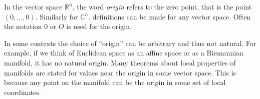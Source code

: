 \documentclass[12pt]{article}
\begin{document}
In the vector space ${\mathbb{R}}^n$, the word {\em origin} refers to the
zero point, that is the point $(0,\ldots,0)$.  Similarly for ${\mathbb{C}}^n$.   definitions can be made for any vector space.  Often the notation $0$ or $O$ is used for the origin.

In some contexts the choice of ``origin'' can be arbitrary and thus not natural.
For example, if we think of Euclidean space as an affine space or as a Riemannian manifold, it has no natural origin.
Many theorems about local properties of manifolds are stated for values near the origin in some vector space.  This is because any point on the manifold can be the origin in some set of local coordinates.
\end{document}
